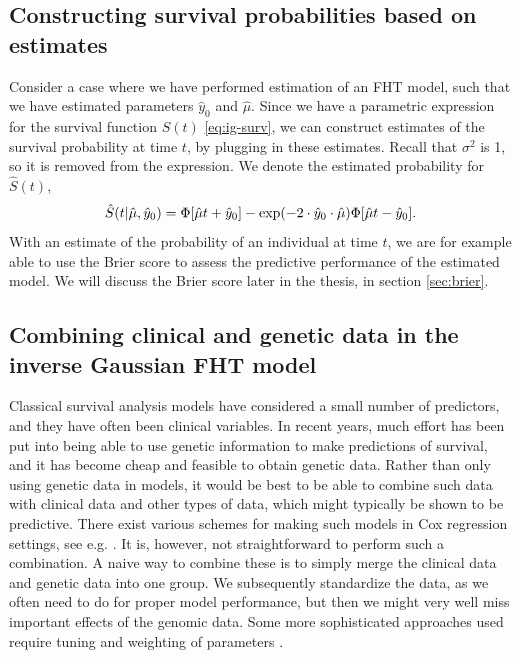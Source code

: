 \subsection{Constructing survival probabilities based on estimates}
Consider a case where we have performed estimation of an FHT model, such that we have estimated parameters $\hat{y}_0$ and $\hat{\mu}$.
Since we have a parametric expression for the survival function $S(t)$ \eqref{eq:ig-surv}, we can construct estimates of the survival probability at time $t$, by plugging in these estimates.
Recall that $\sigma^2$ is 1, so it is removed from the expression.
We denote the estimated probability for $\hat{S}(t)$,
\begin{equation*}
    \hat{S}(t|\hat{\mu},\hat{y}_0)=\Phi\sqb*{\hat{\mu} t+\hat{y}_0}-\exp\p*{-2\cdot\hat{y}_0\cdot\hat{\mu}}\Phi\sqb*{\hat{\mu} t-\hat{y}_0}.
\end{equation*}
With an estimate of the probability of an individual at time $t$, we are for example able to use the Brier score to assess the predictive performance of the estimated model.
We will discuss the Brier score later in the thesis, in section \ref{sec:brier}.



\subsection{Combining clinical and genetic data in the inverse Gaussian FHT model}
\label{subsec:FHT-combine}
Classical survival analysis models have considered a small number of predictors, and they have often been clinical variables.
In recent years, much effort has been put into being able to use genetic information to make predictions of survival, and it has become cheap and feasible to obtain genetic data.
Rather than only using genetic data in models, it would be best to be able to combine such data with clinical data and other types of data, which might typically be shown to be predictive.
There exist various schemes for making such models in Cox regression settings, see e.g. \citet{bovelstad2007}.
It is, however, not straightforward to perform such a combination.
A naive way to combine these is to simply merge the clinical data and genetic data into one group.
We subsequently standardize the data, as we often need to do for proper model performance, but then we might very well miss important effects of the genomic data.
Some more sophisticated approaches used require tuning and weighting of parameters \citep{sauerbrei}.

